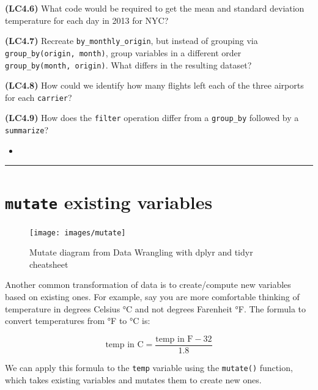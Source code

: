 \documentclass[12pt, krantz2,]{krantz}
\makeatletter
\newenvironment{Shaded}{\begin{snugshade}}{\end{snugshade}}
\newcommand{\DataTypeTok}[1]{\textcolor[rgb]{0.27,0.27,0.27}{#1}}
\newcommand{\DecValTok}[1]{\textcolor[rgb]{0.06,0.06,0.06}{#1}}
\newcommand{\FloatTok}[1]{\textcolor[rgb]{0.06,0.06,0.06}{#1}}
\newcommand{\KeywordTok}[1]{\textcolor[rgb]{0.27,0.27,0.27}{\textbf{#1}}}
\newcommand{\NormalTok}[1]{#1}
\newcommand{\OperatorTok}[1]{\textcolor[rgb]{0.43,0.43,0.43}{\textbf{#1}}}
\newcommand{\StringTok}[1]{\textcolor[rgb]{0.5,0.5,0.5}{#1}}
\newenvironment{kframe}{%
\medskip{}
\setlength{\fboxsep}{.8em}
 \def\at@end@of@kframe{}%
 \ifinner\ifhmode%
  \def\at@end@of@kframe{\end{minipage}}%
  \begin{minipage}{\columnwidth}%
 \fi\fi%
 \def\FrameCommand##1{\hskip\@totalleftmargin \hskip-\fboxsep
 \colorbox{shadecolor}{##1}\hskip-\fboxsep
     \hskip-\linewidth \hskip-\@totalleftmargin \hskip\columnwidth}%
 \MakeFramed {\advance\hsize-\width
   \@totalleftmargin\z@ \linewidth\hsize
   \@setminipage}}%
 {\par\unskip\endMakeFramed%
 \at@end@of@kframe}
\renewenvironment{Shaded}{\begin{kframe}}{\end{kframe}}
\newenvironment{rmdblock}[1]
  {\begin{shaded*}
  \begin{itemize}
  \renewcommand{\labelitemi}{
    \raisebox{-.7\height}[0pt][0pt]{
    }
  }
  \item
  }
  {
  \end{itemize}
  \end{shaded*}
  }
\newenvironment{learncheck}
  {\begin{rmdblock}{warning}}
  {\end{rmdblock}}
\makeatother
\begin{document}
\textbf{(LC4.6)} What code would be required to get the mean and standard deviation temperature for each day in 2013 for NYC?

\textbf{(LC4.7)} Recreate \texttt{by\_monthly\_origin}, but instead of grouping via \texttt{group\_by(origin,\ month)}, group variables in a different order \texttt{group\_by(month,\ origin)}. What differs in the resulting dataset?

\textbf{(LC4.8)} How could we identify how many flights left each of the three airports for each \texttt{carrier}?

\textbf{(LC4.9)} How does the \texttt{filter} operation differ from a \texttt{group\_by} followed by a \texttt{summarize}?

\begin{learncheck}

\end{learncheck}

\begin{center}\rule{0.5\linewidth}{\linethickness}\end{center}

\hypertarget{mutate}{%
\section{\texorpdfstring{\texttt{mutate} existing variables}{mutate existing variables}}\label{mutate}}

\begin{figure}

{\centering \texttt{[image: images/mutate]} 

}

\caption{Mutate diagram from Data Wrangling with dplyr and tidyr cheatsheet}\label{fig:select}
\end{figure}

Another common transformation of data is to create/compute new variables based on existing ones. For example, say you are more comfortable thinking of temperature in degrees Celsius °C and not degrees Farenheit °F. The formula to convert temperatures from °F to °C is:

\[
\text{temp in C} = \frac{\text{temp in F} - 32}{1.8}
\]

We can apply this formula to the \texttt{temp} variable using the \texttt{mutate()} function, which takes existing variables and mutates them to create new ones.

\begin{Shaded}
\end{Shaded}
\end{document}
